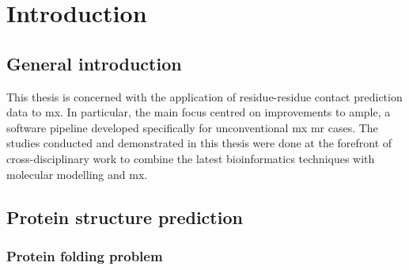 \section{Introduction}
\subsection{General introduction}
This thesis is concerned with the application of residue-residue contact prediction data to \gls{mx}. In particular, the main focus centred on improvements to \gls{ample}, a software pipeline developed specifically for unconventional \gls{mx} \gls{mr} cases. The studies conducted and demonstrated in this thesis were done at the forefront of cross-disciplinary work to combine the latest bioinformatics techniques with molecular modelling and \gls{mx}.



\subsection{Protein structure prediction}
\subsubsection{Protein folding problem}



